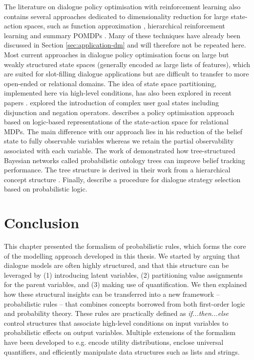 The literature on dialogue policy optimisation with reinforcement learning also contains several approaches dedicated to dimensionality reduction for large state-action spaces, such as function approximation \citep{Henderson:2008}, hierarchical reinforcement learning \citep{Cuayahuitl:2010} and summary POMDPs \citep{Young:2010}.  Many of these techniques have already been discussed in Section \ref{sec:application-dm} and will therefore not be repeated here. Most current approaches in dialogue policy optimisation focus on large but weakly structured state spaces (generally encoded as large lists of features), which are suited for slot-filling dialogue applications but are difficult to transfer to more open-ended or relational domains.  The idea of state space partitioning, implemented here via high-level conditions, has also been explored in recent papers \citep[see e.g. ][]{Williams2010}. \cite{Crook:2010} explored the introduction of complex user goal states including disjunction and negation operators. \cite{Heriberto2011} describes a policy optimisation approach based on logic-based representations of the state-action space for relational MDPs. The main difference with our approach lies in his reduction of the belief state to fully observable variables whereas we retain the partial observability associated with each variable.  The work of \cite{Mehta:2010,Raux2011} demonstrated how tree-structured Bayesian networks called probabilistic ontology trees can improve belief tracking performance.  The tree structure is derived in their work from a hierarchical concept structure .  Finally, \cite{neill2011} describe a procedure for dialogue strategy selection based on probabilistic logic.

\section{Conclusion}

This chapter presented the formalism of probabilistic rules, which forms the core of the modelling approach developed in this thesis. We started by arguing that dialogue models are often highly structured, and that this structure can be leveraged by (1) introducing latent variables, (2) partitioning value assignments for the parent variables, and (3) making use of quantification. We then explained how these structural insights can be transferred into a new framework -- probabilistic rules -- that combines concepts borrowed from both first-order logic and probability theory.  These rules are practically defined as \textit{if...then...else} control structures that associate high-level conditions on input variables to probabilistic effects on output variables.  Multiple extensions of the formalism have been developed to e.g. encode utility distributions, enclose universal quantifiers, and efficiently manipulate data structures such as lists and strings. 

